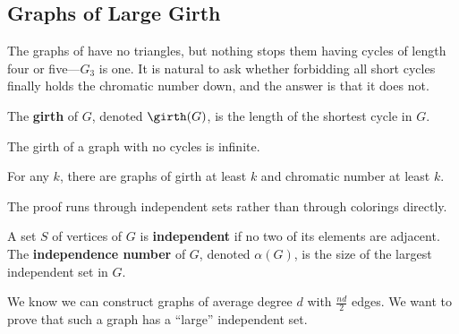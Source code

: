 \subsection{Graphs of Large Girth}

The graphs of  have no triangles, but nothing stops them having cycles of length four or five---$G_3$ is one. It is natural to ask whether forbidding all short cycles finally holds the chromatic number down, and the answer is that it does not.

\begin{boxdefinition}[Girth]
    The \textbf{girth} of $G$, denoted $\girth(G)$, is the length of the shortest cycle in $G$.
\end{boxdefinition}

The girth of a graph with no cycles is infinite.

\begin{boxtheorem}[\Erdos] \label{Ch1:Thm:Erdos_Girth}
    For any $k$, there are graphs of girth at least $k$ and chromatic number at least $k$.
\end{boxtheorem}

The proof runs through independent sets rather than through colorings directly.

\begin{boxdefinition}
    A set $S$ of vertices of $G$ is \textbf{independent} if no two of its elements are adjacent. The \textbf{independence number} of $G$, denoted $\alpha(G)$, is the size of the largest independent set in $G$.
\end{boxdefinition}

We know we can construct graphs of average degree $d$ with $\frac{nd}{2}$ edges. We want to prove that such a graph has a ``large'' independent set.

